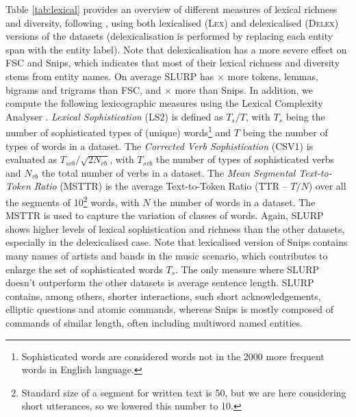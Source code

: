 \documentclass[11pt,a4paper]{article}
\newcommand{\datasetacr}{SLURP}
\begin{document}
 Table \ref{tab:lexical} provides an overview of different measures of lexical richness and diversity, following \cite{novikova-etal-2017-e2e}, using both 
lexicalised (\textsc{Lex}) and delexicalised (\textsc{Delex}) versions of the datasets (delexicalisation is performed by replacing each entity span with the entity label).  Note that delexicalisation has a more severe effect on FSC and Snips, which indicates that most of their lexical richness and diversity stems from entity names. 
On average \datasetacr{} has $\times$ more 
tokens, lemmas, bigrams and trigrams than FSC, and $\times$ more than Snips.
In addition, we compute the following
lexicographic measures using the Lexical Complexity Analyser \cite{lu2012:lex}. \textit{Lexical Sophistication} (LS2) \cite{laufer94:lex} is defined as $T_s/T$, with $T_s$ being the number of sophisticated types of (unique) words\footnote{Sophisticated words are considered words not in the 2000 more frequent words in English language.} and $T$ being the number of types of words in a dataset. The \textit{Corrected Verb Sophistication} (CSV1) \cite{wolfe1998:second} is evaluated as $T_{svb}/\sqrt{2N_{vb}}$, with $T_{svb}$ the number of types of sophisticated verbs and $N_{vb}$ the total number of verbs in a dataset. The \textit{Mean Segmental Text-to-Token Ratio} (MSTTR) \cite{wendell44:lex} is the average Text-to-Token Ratio (TTR -- $T/N$) over all the segments of 10\footnote{Standard size of a segment for written text is 50, but we are here considering short utterances, so we lowered this number to 10.} words, with $N$ the number of words in a dataset. The MSTTR is used to capture the variation of classes of words. Again, \datasetacr{} shows higher levels of lexical sophistication and richness than the other datasets, especially in the delexicalised case. Note that lexicalised version of Snips contains many names of artists and bands in the music scenario, which contributes to enlarge the set of sophisticated words $T_s$.
The only measure where \datasetacr{} doesn't outperform the other datasets is
average sentence length. \datasetacr{} contains, among others,  shorter interactions, such short acknowledgements, elliptic questions and atomic commands, whereas Snips is mostly composed of commands of similar length, often including multiword named entities. 
\end{document}
